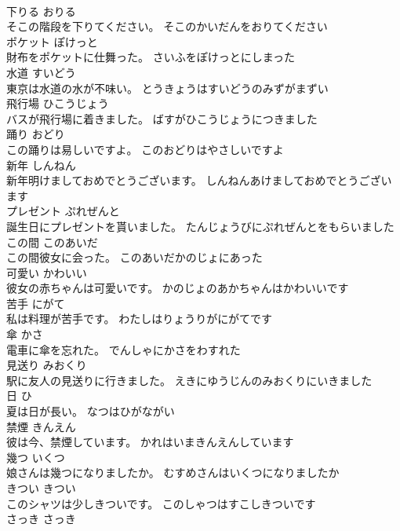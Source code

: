 \documentclass[8pt]{extreport}
\begin{document}
\begin{CJK}{UTF8}{min}
\\	下りる	おりる	
\\	そこの階段を下りてください。	そこのかいだんをおりてください	
\\	ポケット	ぽけっと	
\\	財布をポケットに仕舞った。	さいふをぽけっとにしまった	
\\	水道	すいどう	
\\	東京は水道の水が不味い。	とうきょうはすいどうのみずがまずい	
\\	飛行場	ひこうじょう	
\\	バスが飛行場に着きました。	ばすがひこうじょうにつきました	
\\	踊り	おどり	
\\	この踊りは易しいですよ。	このおどりはやさしいですよ	
\\	新年	しんねん	
\\	新年明けましておめでとうございます。	しんねんあけましておめでとうございます	
\\	プレゼント	ぷれぜんと	
\\	誕生日にプレゼントを貰いました。	たんじょうびにぷれぜんとをもらいました	
\\	この間	このあいだ	
\\	この間彼女に会った。	このあいだかのじょにあった	
\\	可愛い	かわいい	
\\	彼女の赤ちゃんは可愛いです。	かのじょのあかちゃんはかわいいです	
\\	苦手	にがて	
\\	私は料理が苦手です。	わたしはりょうりがにがてです	
\\	傘	かさ	
\\	電車に傘を忘れた。	でんしゃにかさをわすれた	
\\	見送り	みおくり	
\\	駅に友人の見送りに行きました。	えきにゆうじんのみおくりにいきました	
\\	日	ひ	
\\	夏は日が長い。	なつはひがながい	
\\	禁煙	きんえん	
\\	彼は今、禁煙しています。	かれはいまきんえんしています	
\\	幾つ	いくつ	
\\	娘さんは幾つになりましたか。	むすめさんはいくつになりましたか	
\\	きつい	きつい	
\\	このシャツは少しきついです。	このしゃつはすこしきついです	
\\	さっき	さっき	

\end{CJK}
\end{document}
